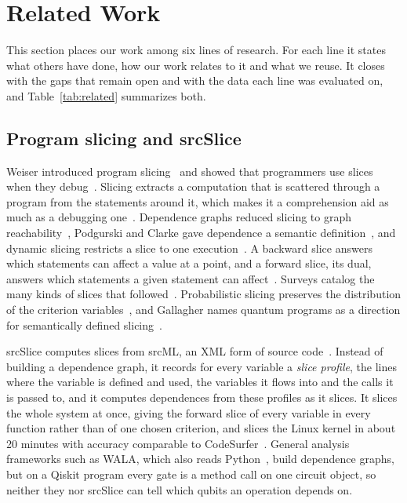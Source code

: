 \section{Related Work}\label{sec:related}

This section places our work among six lines of research. For each line it states what others have done, how
our work relates to it and what we reuse. It closes with the gaps that remain open and with the data each
line was evaluated on, and Table~\ref{tab:related} summarizes both.

\subsection{Program slicing and srcSlice}
Weiser introduced program slicing~\cite{weiser1984program} and showed that programmers use slices when they
debug~\cite{weiser1982programmers}. Slicing extracts a computation that is scattered through a program from the statements around it,
which makes it a comprehension aid as much as a debugging one~\cite{binkley2007source}. Dependence graphs reduced slicing to graph
reachability~\cite{ottenstein1984pdg, ferrante1987pdg, horwitz1990interprocedural}, Podgurski and Clarke gave
dependence a semantic definition~\cite{podgurski1990formal}, and dynamic slicing restricts a slice to one
execution~\cite{korel1988dynamic, agrawal1990dynamic}. A backward slice answers which statements can affect a
value at a point, and a forward slice, its dual, answers which statements a given statement can
affect~\cite{tip1994a, horwitz1990interprocedural}. Surveys catalog the many kinds of slices that
followed~\cite{tip1994a, silva2012vocabulary, binkley2004a}. Probabilistic slicing preserves the distribution of the
criterion variables~\cite{hur2014slicing, amtoft2020theory, olmedo2025slicing}, and Gallagher names quantum
programs as a direction for semantically defined slicing~\cite{gallagher2025program}.

srcSlice computes slices from srcML, an XML form of source code~\cite{collard2011lightweight, collard2013srcml}. Instead of building a dependence graph, it records
for every variable a \emph{slice profile}, the lines where the variable is defined and used, the variables it flows
into and the calls it is passed to, and it computes dependences from these profiles as it slices. It slices the
whole system at once, giving the forward slice of every variable in every function rather than of one chosen
criterion, and slices the Linux kernel in about 20 minutes with accuracy comparable to
CodeSurfer~\cite{alomari2014srcslice}. General
analysis frameworks such as WALA, which also reads Python~\cite{wala}, build dependence graphs, but on a Qiskit
program every gate is a method call on one circuit object, so neither they nor srcSlice can tell which qubits an
operation depends on.

